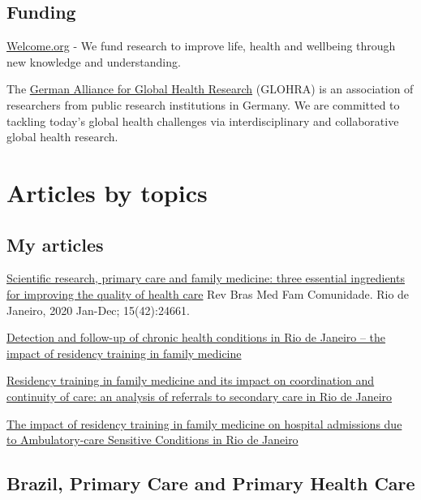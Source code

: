 \documentclass[
  letterpaper,
  DIV=11,
  numbers=noendperiod]{scrreprt}
\begin{document}
\section{Funding}\label{funding}

\href{https://wellcome.org/research-funding}{Welcome.org} - We fund
research to improve life, health and wellbeing through new knowledge and
understanding.

The \href{https://www.globalhealth.de/about/}{German Alliance for Global
Health Research} (GLOHRA) is an association of researchers from public
research institutions in Germany. We are committed to tackling today's
global health challenges via interdisciplinary and collaborative global
health research.


\chapter{Articles by topics}\label{articles-by-topics}

\section{My articles}\label{my-articles}

\href{https://rbmfc.org.br/rbmfc/article/view/2466/1565}{Scientific
research, primary care and family medicine: three essential ingredients
for improving the quality of health care} Rev Bras Med Fam Comunidade.
Rio de Janeiro, 2020 Jan-Dec; 15(42):24661.

\href{https://bmcprimcare.biomedcentral.com/articles/10.1186/s12875-021-01542-5}{Detection
and follow-up of chronic health conditions in Rio de Janeiro -- the
impact of residency training in family medicine}

\href{https://pmc.ncbi.nlm.nih.gov/articles/PMC8852675/pdf/bmjopen-2021-051515.pdf}{Residency
training in family medicine and its impact on coordination and
continuity of care: an analysis of referrals to secondary care in Rio de
Janeiro}

\href{https://journals.plos.org/globalpublichealth/article?id=10.1371/journal.pgph.0000547}{The
impact of residency training in family medicine on hospital admissions
due to Ambulatory-care Sensitive Conditions in Rio de Janeiro}

\section{Brazil, Primary Care and Primary Health
Care}\label{brazil-primary-care-and-primary-health-care}
\end{document}
